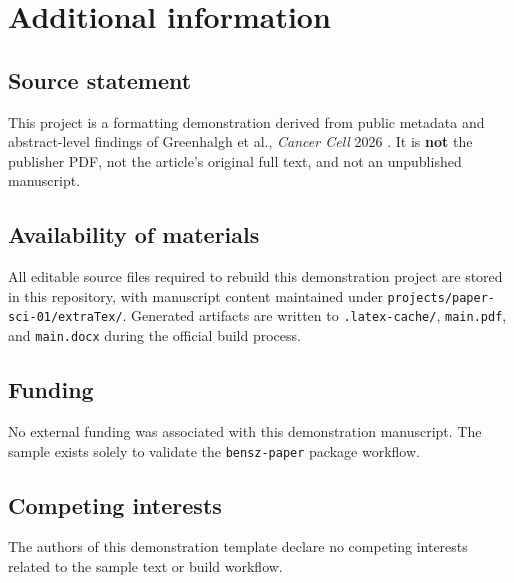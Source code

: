 \section{Additional information}

\subsection{Source statement}
This project is a formatting demonstration derived from public metadata
and abstract-level findings of Greenhalgh et al., \emph{Cancer Cell}
2026 \supercite{Greenhalgh_2026}. It is \textbf{not} the publisher PDF, not the
article's original full text, and not an unpublished manuscript.

\subsection{Availability of materials}
All editable source files required to rebuild this demonstration project
are stored in this repository, with manuscript content maintained under
\texttt{projects/paper-sci-01/extraTex/}. Generated artifacts are
written to \texttt{.latex-cache/}, \texttt{main.pdf}, and
\texttt{main.docx} during the official build process.

\subsection{Funding}
No external funding was associated with this demonstration manuscript.
The sample exists solely to validate the \texttt{bensz-paper} package
workflow.

\subsection{Competing interests}
The authors of this demonstration template declare no competing
interests related to the sample text or build workflow.
